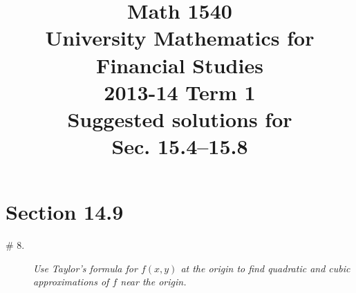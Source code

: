 \documentclass[8pt]{article} %
\title{Math 1540\\University Mathematics for Financial Studies\\2013-14 Term 1\\Suggested solutions for\\
Sec. 15.4--15.8}
\begin{document}
\maketitle
\section{Section 14.9}
\begin{description}
	\item[\# 8.]{{\it Use Taylor's formula for $f(x,y)$ at the origin to find quadratic and cubic approximations of $f$ near the origin.}
		}
\end{description}
\end{document}
